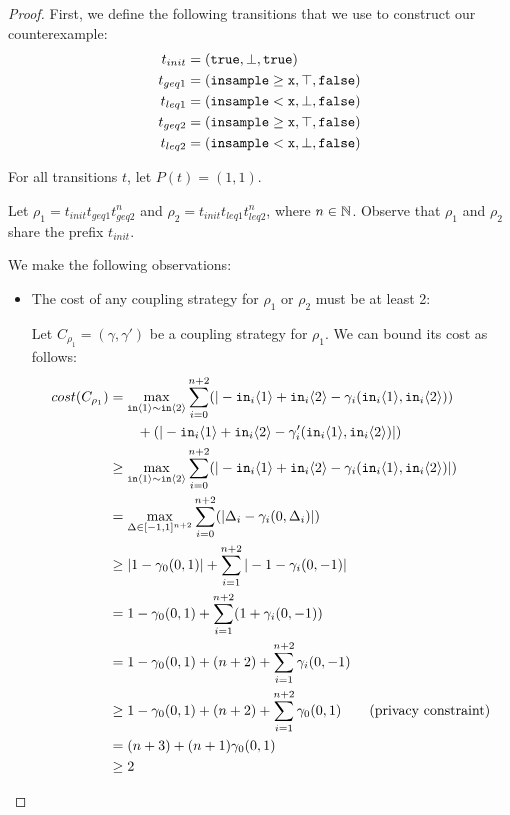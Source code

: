 \begin{proof}
    First, we define the following transitions that we use to construct our counterexample:
    \begin{align*}
        t_{init} &= (\texttt{true}, \bot, \texttt{true})\\
        t_{geq1} &= (\gguard[\texttt{x}], \top, \texttt{false})\\
        t_{leq1} &= (\lguard[\texttt{x}], \bot, \texttt{false})\\
        t_{geq2} &= (\gguard[\texttt{x}], \top, \texttt{false})\\
        t_{leq2} &= (\lguard[\texttt{x}], \bot, \texttt{false})
    \end{align*}

    For all transitions $t$, let $P(t) = (1, 1)$.

    Let $\rho_1 = t_{init}t_{geq1}t_{geq2}^n$ and $\rho_2 = t_{init}t_{leq1}t_{leq2}^n$, where $n\in \NN$. Observe that $\rho_1$ and $\rho_2$ share the prefix $t_{init}$. 
    
    We make the following observations: 
    \begin{itemize}
        \item The cost of any coupling strategy for $\rho_1$ or $\rho_2$ must be at least 2:
        
        Let $C_{\rho_1} = (\gamma, \gamma')$ be a coupling strategy for $\rho_1$. We can bound its cost as follows: 
        \begin{align*}
            cost(C_{\rho_1}) &= \max_{\texttt{in}\brangle{1}\sim\texttt{in}\brangle{2}}\sum_{i=0}^{n+2}(|-\texttt{in}_i\brangle{1}+\texttt{in}_i\brangle{2}-\gamma_i(\texttt{in}_i\brangle{1}, \texttt{in}_i\brangle{2}))\\&\qquad+(|-\texttt{in}_i\brangle{1}+\texttt{in}_i\brangle{2}-\gamma_i'(\texttt{in}_i\brangle{1}, \texttt{in}_i\brangle{2})|)\\
            &\geq \max_{\texttt{in}\brangle{1}\sim\texttt{in}\brangle{2}} \sum_{i=0}^{n+2}(|-\texttt{in}_i\brangle{1}+\texttt{in}_i\brangle{2}-\gamma_i(\texttt{in}_i\brangle{1}, \texttt{in}_i\brangle{2})|)\\
            &= \max_{\Delta \in [-1, 1]^{n+2}} \sum_{i=0}^{n+2}(|\Delta_i-\gamma_i(0, \Delta_i)|)\\
            &\geq |1 - \gamma_0(0, 1)| + \sum_{i=1}^{n+2}|-1-\gamma_i(0, -1)|\\
            &= 1 - \gamma_0(0, 1) + \sum_{i=1}^{n+2} (1+\gamma_i(0, -1))\\
            &= 1 - \gamma_0(0, 1) + (n + 2) + \sum_{i=1}^{n+2}\gamma_i(0, -1)\\
            &\geq 1 - \gamma_0(0, 1) + (n + 2) + \sum_{i=1}^{n+2}\gamma_0(0, 1) \qquad \text{(privacy constraint)}\\
            &= (n + 3) + (n + 1) \gamma_0(0, 1)\\
            &\geq 2
        \end{align*}


\end{itemize}
\end{proof}
